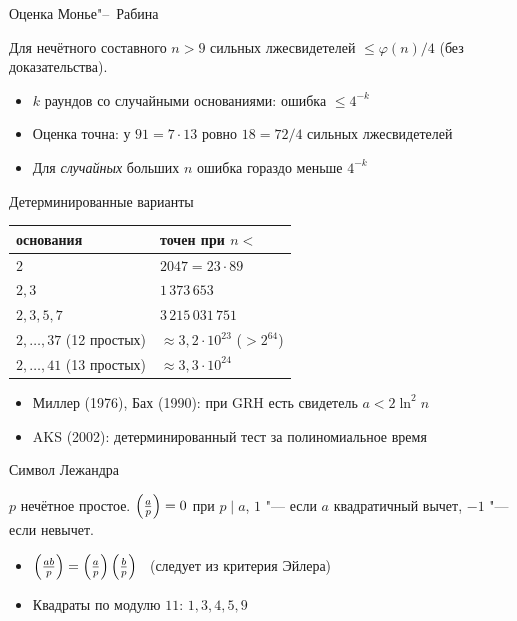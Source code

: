 \documentclass{ca-slides}
\begin{document}
\begin{canvasframe}{Оценка Монье"--~Рабина}
  \begin{theorem}
    Для нечётного составного $n > 9$ сильных лжесвидетелей $\le \varphi(n)/4$
    \quad (без доказательства).
  \end{theorem}
  \begin{itemize}
    \item $k$ раундов со случайными основаниями: ошибка $\le 4^{-k}$
    \item Оценка точна: у $91 = 7 \cdot 13$ ровно $18 = 72/4$ сильных лжесвидетелей
    \item Для \emph{случайных} больших $n$ ошибка гораздо меньше $4^{-k}$
  \end{itemize}
\end{canvasframe}

\begin{canvasframe}{Детерминированные варианты}
  \small
  \begin{tabular}{l|l}
    основания & точен при $n <{}$ \\ \hline
    $2$ & $2047 = 23 \cdot 89$ \\
    $2, 3$ & $1\,373\,653$ \\
    $2, 3, 5, 7$ & $3\,215\,031\,751$ \\
    $2, \ldots, 37$ (12 простых) & $\approx 3{,}2 \cdot 10^{23}$ \quad ($> 2^{64}$) \\
    $2, \ldots, 41$ (13 простых) & $\approx 3{,}3 \cdot 10^{24}$
  \end{tabular}
  \begin{itemize}
    \item Миллер (1976), Бах (1990): при GRH есть свидетель $a < 2 \ln^2 n$
    \item AKS (2002): детерминированный тест за полиномиальное время
  \end{itemize}
\end{canvasframe}

\begin{canvasframe}{Символ Лежандра}
  \begin{definition}
    $p$ нечётное простое. $\left(\frac{a}{p}\right) = 0$ при $p \mid a$, $1$ "--- если $a$ квадратичный
    вычет, $-1$ "--- если невычет.
  \end{definition}
  \begin{itemize}
    \item $\left(\frac{ab}{p}\right) = \left(\frac{a}{p}\right)\left(\frac{b}{p}\right)$ \ (следует из критерия Эйлера)
    \item Квадраты по модулю $11$: $1, 3, 4, 5, 9$
  \end{itemize}
  \notearea[0.2\textheight]
\end{canvasframe}
\end{document}
